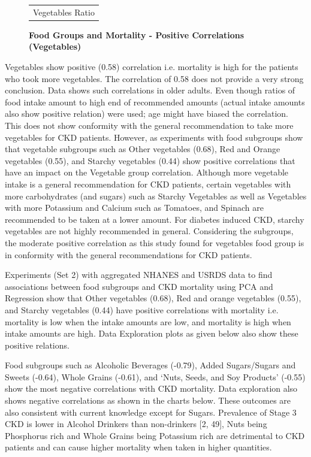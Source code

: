\begin{figure}
\begin{tabular}{cc}
	\multicolumn{2}{c}{Vegetables Ratio}  \\ 
\end{tabular}
\centering
\caption{\textbf{Food Groups and Mortality - Positive Correlations (Vegetables) }}
\end{figure}

\noindent Vegetables show positive (0.58) correlation i.e. mortality is high for the patients who took more vegetables. The correlation of 0.58 does not provide a very strong conclusion. Data shows such correlations in older adults. Even though ratios of food intake amount to high end of recommended amounts (actual intake amounts also show positive relation) were used; age might have biased the correlation. This does not show conformity with the general recommendation to take more vegetables for CKD patients. However, as experiments with food subgroups show that vegetable subgroups such as Other vegetables (0.68), Red and Orange vegetables (0.55), and Starchy vegetables (0.44) show positive correlations that have an impact on the Vegetable group correlation.  Although more vegetable intake is a general recommendation for CKD patients, certain vegetables with more carbohydrates (and sugars) such as Starchy Vegetables as well as Vegetables with more Potassium and Calcium such as Tomatoes, and Spinach are recommended to be taken at a lower amount. For diabetes induced CKD, starchy vegetables are not highly recommended in general. Considering the subgroups, the moderate positive correlation as this study found for vegetables food group is in conformity with the general recommendations for CKD patients.

\noindent Experiments (Set 2) with aggregated NHANES and USRDS data to find associations between food subgroups and CKD mortality using PCA and Regression show that  Other vegetables (0.68),    Red and orange vegetables (0.55), and Starchy vegetables (0.44)  have positive correlations with mortality i.e. mortality is low when the intake amounts are low, and mortality is high when intake amounts are high. Data Exploration plots as given below also show these positive relations.

\noindent  Food subgroups such as Alcoholic Beverages (-0.79),    Added Sugars/Sugars and Sweets (-0.64), Whole Grains (-0.61), and  `Nuts, Seeds, and Soy Products' (-0.55) show the most negative correlations with CKD mortality. Data exploration also shows negative correlations as shown in the charts below. These outcomes are also consistent with current knowledge except for Sugars. Prevalence of Stage 3 CKD is lower in Alcohol Drinkers than non-drinkers [2, 49], Nuts being Phosphorus rich and Whole Grains being Potassium rich are detrimental to CKD patients and can cause higher mortality when taken in higher quantities.

